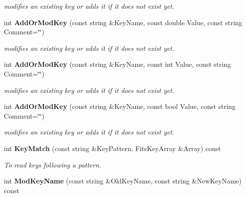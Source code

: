 \begin{CompactItemize}
\begin{CompactList}\small\item\em modifies an existing key or adds it if it does not exist yet.\item\end{CompactList}\item 
{}
int {\bf Add\-Or\-Mod\-Key} (const string \&Key\-Name, const double Value, const string Comment=\char`\"{}\char`\"{})\label{class_fitsheader_a19}

\begin{CompactList}\small\item\em modifies an existing key or adds it if it does not exist yet.\item\end{CompactList}\item 
{}
int {\bf Add\-Or\-Mod\-Key} (const string \&Key\-Name, const int Value, const string Comment=\char`\"{}\char`\"{})\label{class_fitsheader_a20}

\begin{CompactList}\small\item\em modifies an existing key or adds it if it does not exist yet.\item\end{CompactList}\item 
{}
int {\bf Add\-Or\-Mod\-Key} (const string \&Key\-Name, const bool Value, const string Comment=\char`\"{}\char`\"{})\label{class_fitsheader_a21}

\begin{CompactList}\small\item\em modifies an existing key or adds it if it does not exist yet.\item\end{CompactList}\item 
int {\bf Key\-Match} (const string \&Key\-Pattern, Fits\-Key\-Array \&Array) const
\begin{CompactList}\small\item\em To read keys following a pattern.\item\end{CompactList}\item 
{}
int {\bf Mod\-Key\-Name} (const string \&Old\-Key\-Name, const string \&New\-Key\-Name) const\label{class_fitsheader_a23}


\end{CompactItemize}
